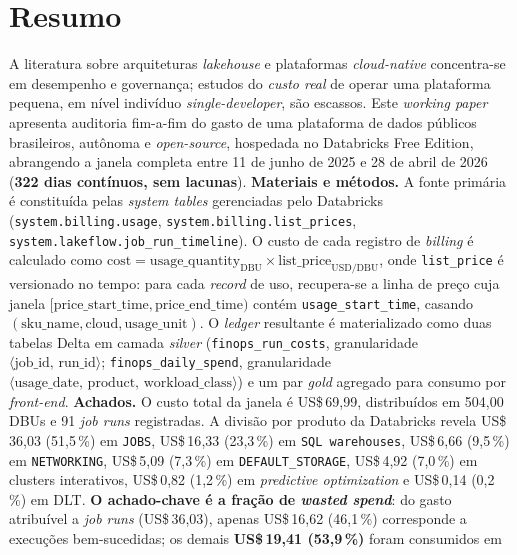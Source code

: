 \documentclass[12pt,a4paper,oneside]{article}
\newcommand{\us}{US\$\,}
\begin{document}
\section*{Resumo}
\begin{singlespace}\small\noindent
A literatura sobre arquiteturas \textit{lakehouse} e plataformas
\textit{cloud-native} concentra-se em desempenho e governança;
estudos do \textit{custo real} de operar uma plataforma pequena, em
nível indivíduo \textit{single-developer}, são escassos. Este
\textit{working paper} apresenta auditoria fim-a-fim do gasto de
uma plataforma de dados públicos brasileiros, autônoma e
\textit{open-source}, hospedada no Databricks Free Edition,
abrangendo a janela completa entre 11 de junho de 2025 e 28 de
abril de 2026 (\textbf{322 dias contínuos, sem lacunas}).
\textbf{Materiais e métodos.} A fonte primária é constituída pelas
\textit{system tables} gerenciadas pelo Databricks
(\texttt{system.billing.usage}, \texttt{system.billing.list\_prices},
\texttt{system.lakeflow.job\_run\_timeline}). O custo de cada
registro de \textit{billing} é calculado como
\(\text{cost} = \text{usage\_quantity}_{\mathrm{DBU}} \times
\text{list\_price}_{\mathrm{USD/DBU}}\), onde \texttt{list\_price} é
versionado no tempo: para cada \textit{record} de uso, recupera-se a
linha de preço cuja janela
\([\text{price\_start\_time}, \text{price\_end\_time})\) contém
\texttt{usage\_start\_time}, casando \((\text{sku\_name},
\text{cloud}, \text{usage\_unit})\). O \textit{ledger} resultante
é materializado como duas tabelas Delta em camada \textit{silver}
(\texttt{finops\_run\_costs}, granularidade
\(\langle\text{job\_id, run\_id}\rangle\); \texttt{finops\_daily\_spend},
granularidade \(\langle\text{usage\_date, product, workload\_class}\rangle\))
e um par \textit{gold} agregado para consumo por \textit{front-end}.
\textbf{Achados.} O custo total da janela é \us 69{,}99,
distribuídos em 504,00 DBUs e 91 \textit{job runs} registradas. A
divisão por produto da Databricks revela \us 36{,}03 (51,5\,\%) em
\texttt{JOBS}, \us 16{,}33 (23,3\,\%) em \texttt{SQL warehouses},
\us 6{,}66 (9,5\,\%) em \texttt{NETWORKING}, \us 5{,}09 (7,3\,\%) em
\texttt{DEFAULT\_STORAGE}, \us 4{,}92 (7,0\,\%) em
clusters interativos, \us 0{,}82 (1,2\,\%) em \textit{predictive
optimization} e \us 0{,}14 (0,2\,\%) em DLT.
\textbf{O achado-chave é a fração de \textit{wasted spend}}: do
gasto atribuível a \textit{job runs} (\us 36{,}03), apenas
\us 16{,}62 (46,1\,\%) corresponde a execuções bem-sucedidas; os
demais \textbf{\us 19{,}41 (53,9\,\%)} foram consumidos em

\end{singlespace}
\end{document}
